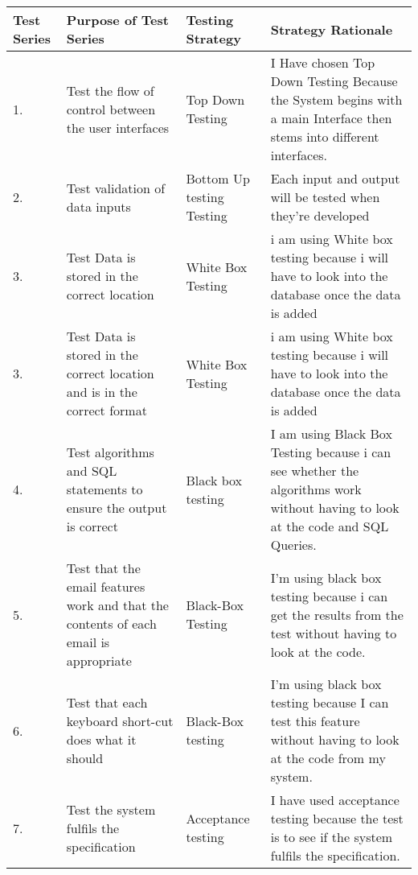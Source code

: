 \begin{landscape}
\begin{center}
    \begin{tabular}{|p{2cm}|p{5cm}|p{5cm}|p{4cm}|}
        \hline
	
	 \textbf{Test Series} & \textbf{Purpose of Test Series} & \textbf{Testing Strategy} & \textbf{Strategy Rationale}\\ \hline
	1. & Test the flow of control between the user interfaces & Top Down Testing & I Have chosen Top Down Testing Because the System begins with a main Interface then stems into different interfaces. \\ \hline
	2. & Test validation of data inputs & Bottom Up testing Testing &  Each input and output will be tested when they're developed\\ \hline
	\rowcolor{dark-grey} 3. & Test Data is stored in the correct location & White Box Testing & i am using White box testing because i will have to look into the database once the data is added \\ \hline
	\rowcolor{light-grey} 3. & Test Data is stored in the correct location and is in the correct format & White Box Testing & i am using White box testing because i will have to look into the database once the data is added \\ \hline
	4. & Test algorithms and SQL statements to ensure the output is correct & Black box testing & I am using Black Box Testing because i can see whether the algorithms work without having to look at the code and SQL Queries. \\ \hline
	\rowcolor{light-grey} 5. & Test that the email features work and that the contents of each email is appropriate & Black-Box Testing & I'm using black box testing because i can get the results from the test without having to look at the code.\\ \hline
	\rowcolor{light-grey} 6. & Test that each keyboard short-cut does what it should & Black-Box testing & I'm using black box testing because I can test this feature without having to look at the code from my system. \\ \hline
	7. & Test the system fulfils the specification & Acceptance testing & I have used acceptance testing because the test is to see if the system fulfils the specification. \\ \hline

    \end{tabular}
\end{center}
\end{landscape}
